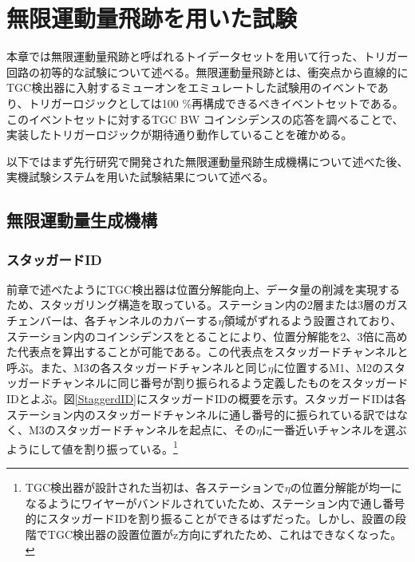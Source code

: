 \section{無限運動量飛跡を用いた試験}
\label{sec_IMT}

本章では無限運動量飛跡と呼ばれるトイデータセットを用いて行った、トリガー回路の初等的な試験について述べる。無限運動量飛跡とは、衝突点から直線的にTGC検出器に入射するミューオンをエミュレートした試験用のイベントであり、トリガーロジックとしては100 \%再構成できるべきイベントセットである。このイベントセットに対するTGC BW コインシデンスの応答を調べることで、実装したトリガーロジックが期待通り動作していることを確かめる。

以下ではまず先行研究で開発された無限運動量飛跡生成機構について述べた後、実機試験システムを用いた試験結果について述べる。

\subsection{無限運動量生成機構}
\label{subsec_IMT_generation}

\subsubsection{スタッガードID}
前章で述べたようにTGC検出器は位置分解能向上、データ量の削減を実現するため、スタッガリング構造を取っている。ステーション内の2層または3層のガスチェンバーは、各チャンネルのカバーする$\eta$領域がずれるよう設置されており、ステーション内のコインシデンスをとることにより、位置分解能を2、3倍に高めた代表点を算出することが可能である。この代表点をスタッガードチャンネルと呼ぶ。また、M3の各スタッガードチャンネルと同じ$\eta$に位置するM1、M2のスタッガードチャンネルに同じ番号が割り振られるよう定義したものをスタッガードIDとよぶ。図\ref{StaggerdID}にスタッガードIDの概要を示す。スタッガードIDは各ステーション内のスタッガードチャンネルに通し番号的に振られている訳ではなく、M3のスタッガードチャンネルを起点に、その$\eta$に一番近いチャンネルを選ぶようにして値を割り振っている。\footnote{TGC検出器が設計された当初は、各ステーションで$\eta$の位置分解能が均一になるようにワイヤーがバンドルされていたため、ステーション内で通し番号的にスタッガードIDを割り振ることができるはずだった。しかし、設置の段階でTGC検出器の設置位置がz方向にずれたため、これはできなくなった。}

